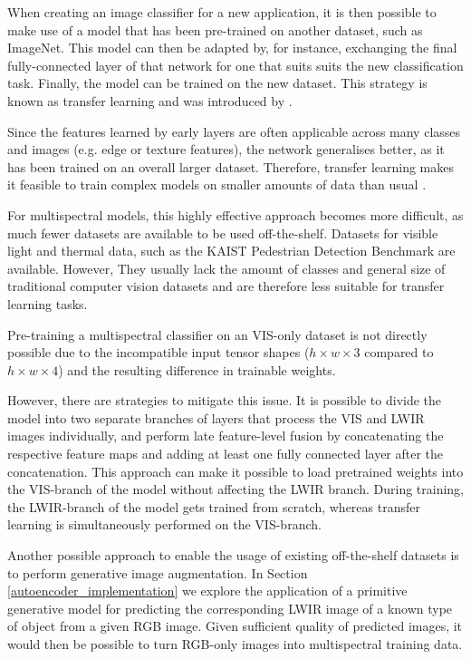 \documentclass{l4proj}
\begin{document}
When creating an image classifier for a new application, it is then possible to make use of a model that has been pre-trained on another dataset, such as ImageNet. This model can then be adapted by, for instance, exchanging the final fully-connected layer of that network for one that suits suits the new classification task. Finally, the model can be trained on the new dataset. This strategy is known as transfer learning and was introduced by \citet{thrun_is_1996}.

Since the features learned by early layers are often applicable across many classes and images (e.g. edge or texture features), the network generalises better, as it has been trained on an overall larger dataset. Therefore, transfer learning makes it feasible to train complex models on smaller amounts of data than usual \citep{kwasniewska_deep_2017}.

For multispectral models, this highly effective approach becomes more difficult, as much fewer datasets are available to be used off-the-shelf. Datasets for visible light and thermal data, such as the KAIST Pedestrian Detection Benchmark \citep{hwang_multispectral_2015} are available. However, They usually lack the amount of classes and general size of traditional computer vision datasets and are therefore less suitable for transfer learning tasks.

Pre-training a multispectral classifier on an VIS-only dataset is not directly possible due to the incompatible input tensor shapes ($h \times w \times 3$ compared to $h \times w \times 4$) and the resulting difference in trainable weights.

However, there are strategies to mitigate this issue. It is possible to divide the model into two separate branches of layers that process the VIS and LWIR images individually, and perform late feature-level fusion \citep{guo_face_2017} by concatenating the respective feature maps and adding at least one fully connected layer after the concatenation. This approach can make it possible to load pretrained weights into the VIS-branch of the model without affecting the LWIR branch. During training, the LWIR-branch of the model gets trained from scratch, whereas transfer learning is simultaneously performed on the VIS-branch.

Another possible approach to enable the usage of existing off-the-shelf datasets is to perform generative image augmentation. In Section \ref{autoencoder_implementation} we explore the application of a primitive generative model for predicting the corresponding LWIR image of a known type of object from a given RGB image. Given sufficient quality of predicted images, it would then be possible to turn RGB-only images into multispectral training data.
\end{document}
